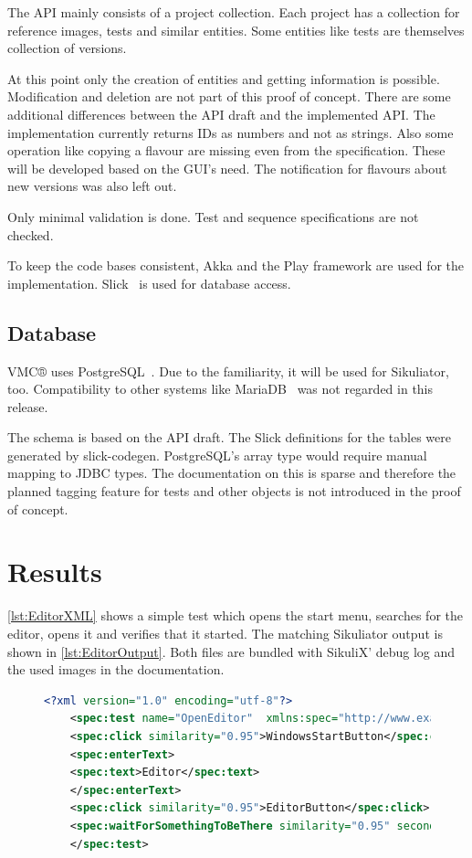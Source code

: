 \documentclass[a4paper,twocolumn,twoside]{article}
\newcommand{\VMC}[0]{VMC®}
\newcommand{\Sik}[0]{Sikuliator}
\begin{document}
The API mainly consists of a project collection.
Each project has a collection for reference images, tests and similar entities.
Some entities like tests are themselves collection of versions.

At this point only the creation of entities and getting information is possible.
Modification and deletion are not part of this proof of concept.
There are some additional differences between the API draft and the implemented API.
The implementation currently returns IDs as numbers and not as strings.
Also some operation like copying a flavour are missing even from the specification.
These will be developed based on the GUI's need.
The notification for flavours about new versions was also left out.

Only minimal validation is done.
Test and sequence specifications are not checked.

To keep the code bases consistent, Akka and the Play framework are used for the implementation.
Slick~\cite{Slick} is used for database access.

\subsection{Database}
\VMC{} uses PostgreSQL~\cite{PostgreSQL}.
Due to the familiarity, it will be used for \Sik{}, too.
Compatibility to other systems like MariaDB~\cite{MariaDB} was not regarded in this release.

The schema is based on the API draft.
The Slick definitions for the tables were generated by slick-codegen.
PostgreSQL's array type would require manual mapping to JDBC types.
The documentation on this is sparse and therefore the planned tagging feature for tests and other objects is not introduced in the proof of concept.


\section{Results}

\autoref{lst:EditorXML} shows a simple test which opens the start menu, searches for the editor, opens it and verifies that it started. 
The matching Sikuliator output is shown in \autoref{lst:EditorOutput}.
Both files are bundled with SikuliX' debug log and the used images in the documentation.
\begin{figure}
	\begin{lstlisting}[language=XML,caption={Example test case specification},label={lst:EditorXML}]
	<?xml version="1.0" encoding="utf-8"?>
	<spec:test name="OpenEditor"  xmlns:spec="http://www.example.org/Sikuliator">
	<spec:click similarity="0.95">WindowsStartButton</spec:click>
	<spec:enterText>
	<spec:text>Editor</spec:text>
	</spec:enterText>
	<spec:click similarity="0.95">EditorButton</spec:click>
	<spec:waitForSomethingToBeThere similarity="0.95" secondsToWait="10">EditorTop</spec:waitForSomethingToBeThere>
	</spec:test>
	\end{lstlisting}
\end{figure}
\end{document}
